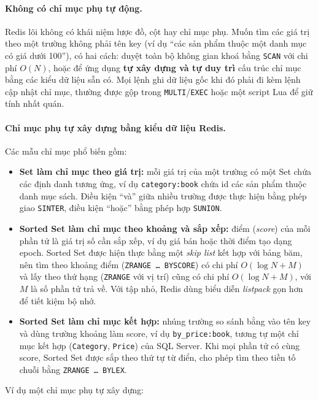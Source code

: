 \paragraph{Không có chỉ mục phụ tự động.} Redis lõi không có khái niệm lược đồ, cột hay chỉ mục phụ. Muốn tìm các giá trị theo một trường không phải tên key (ví dụ ``các sản phẩm thuộc một danh mục có giá dưới 100''), có hai cách: duyệt toàn bộ không gian khoá bằng \texttt{SCAN} với chi phí $O(N)$, hoặc để ứng dụng \textbf{tự xây dựng và tự duy trì} cấu trúc chỉ mục bằng các kiểu dữ liệu sẵn có. Mọi lệnh ghi dữ liệu gốc khi đó phải đi kèm lệnh cập nhật chỉ mục, thường được gộp trong \texttt{MULTI}/\texttt{EXEC} hoặc một script Lua để giữ tính nhất quán.

\paragraph{Chỉ mục phụ tự xây dựng bằng kiểu dữ liệu Redis.} Các mẫu chỉ mục phổ biến gồm:

\begin{itemize}
    \item \textbf{Set làm chỉ mục theo giá trị:} mỗi giá trị của một trường có một Set chứa các định danh tương ứng, ví dụ \texttt{category:book} chứa id các sản phẩm thuộc danh mục sách. Điều kiện ``và'' giữa nhiều trường được thực hiện bằng phép giao \texttt{SINTER}, điều kiện ``hoặc'' bằng phép hợp \texttt{SUNION}.
    \item \textbf{Sorted Set làm chỉ mục theo khoảng và sắp xếp:} điểm (\emph{score}) của mỗi phần tử là giá trị số cần sắp xếp, ví dụ giá bán hoặc thời điểm tạo dạng epoch. Sorted Set được hiện thực bằng một \emph{skip list} kết hợp với bảng băm, nên tìm theo khoảng điểm (\texttt{ZRANGE \ldots{} BYSCORE}) có chi phí $O(\log N + M)$ và lấy theo thứ hạng (\texttt{ZRANGE} với vị trí) cũng có chi phí $O(\log N + M)$, với $M$ là số phần tử trả về. Với tập nhỏ, Redis dùng biểu diễn \emph{listpack} gọn hơn để tiết kiệm bộ nhớ.
    \item \textbf{Sorted Set làm chỉ mục kết hợp:} nhúng trường so sánh bằng vào tên key và dùng trường khoảng làm score, ví dụ \texttt{by\_price:book}, tương tự một chỉ mục kết hợp (\texttt{Category}, \texttt{Price}) của SQL Server. Khi mọi phần tử có cùng score, Sorted Set được sắp theo thứ tự từ điển, cho phép tìm theo tiền tố chuỗi bằng \texttt{ZRANGE \ldots{} BYLEX}.
\end{itemize}

Ví dụ một chỉ mục phụ tự xây dựng:

